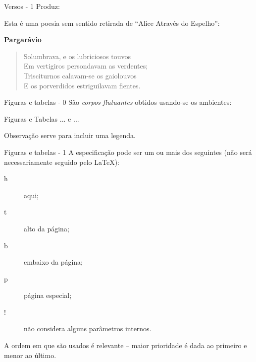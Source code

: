 \begin{frame}{Versos - 1}
	Produz:

	\begin{Resultado}{}
		Esta é uma poesia sem sentido retirada de
		``Alice Através do Espelho'':
		\begin{center}
			\textbf{Pargarávio}
		\end{center}
		\begin{verse}
			Solumbrava, e os lubriciosos touvos \\
			Em vertigiros persondavam as verdentes; \\
			Trisciturnos calavam-se os gaiolouvos \\
			E os porverdidos estriguilavam fientes.
		\end{verse}
	\end{Resultado}
\end{frame}

\begin{frame}{Figuras e tabelas - 0}
	São \emph{corpos flutuantes} obtidos usando-se os ambientes:
	\begin{Codigo}{Figuras e Tabelas}
		\Lopt[especificação] \n
			... \n
			 \n
		 \n
		e \n
		\Lopt[especificação] \n
			... \n
			 \n
	\end{Codigo}

	\begin{Observacao}{Observação}
		 serve para incluir uma legenda.
	\end{Observacao}
\end{frame}

\begin{frame}{Figuras e tabelas - 1}
	A especificação pode ser um ou mais dos seguintes (não será necessariamente seguido pelo \LaTeX):
	\pause
	\begin{description}
		\item [h] aqui;
		\pause
		\item [t] alto da página;
		\pause
		\item [b] embaixo da página;
        \pause
		\item [p] página especial;
		\pause
		\item [!] não considera alguns parâmetros internos.
	\end{description}

    \pause
	\begin{Observacao}{}
		A ordem em que são usados é relevante -- maior prioridade é dada ao primeiro e menor ao último.
	\end{Observacao}
\end{frame}

